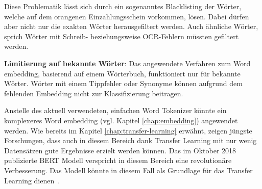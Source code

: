 Diese Problematik lässt sich durch ein sogenanntes Blacklisting der Wörter, welche auf dem orangenen Einzahlungsschein vorkommen, lösen. Dabei dürfen aber nicht nur die exakten Wörter herausgefiltert werden. Auch ähnliche Wörter, sprich Wörter mit Schreib- beziehungsweise OCR-Fehlern müssten gefiltert werden.


\textbf{Limitierung auf bekannte Wörter}: Das angewendete Verfahren zum Word embedding, basierend auf einem Wörterbuch, funktioniert nur für bekannte Wörter. Wörter mit einem Tippfehler oder Synonyme können aufgrund dem fehlenden Embedding nicht zur Klassifizierung beitragen.

Anstelle des aktuell verwendeten, einfachen Word Tokenizer könnte ein komplexeres Word embedding (vgl. Kapitel \ref{chap:embedding}) angewendet werden. Wie bereits im Kapitel \ref{chap:transfer-learning} erwähnt, zeigen jüngste Forschungen, dass auch in diesem Bereich dank Transfer Learning mit nur wenig Datensätzen gute Ergebnisse erzielt werden können. Das im Oktober 2018 publizierte BERT Modell verspricht in diesem Bereich eine revolutionäre Verbesserung. Das Modell könnte in diesem Fall als Grundlage für das Transfer Learning dienen~\autocite{Devlin2018}.
